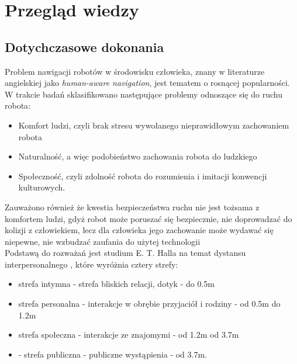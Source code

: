 \chapter{Przegląd wiedzy}

\section{Dotychczasowe dokonania}

Problem nawigacji robotów w środowisku człowieka, znany w literaturze angielskiej jako {\textit{human-aware navigation}}, jest tematem o rosnącej popularności. W trakcie badań sklasifikowano następujące problemy odnoszące się do ruchu robota\cite{survey}:

\begin{itemize}
\item Komfort ludzi, czyli brak stresu wywołanego nieprawidłowym zachowaniem robota
\item Naturalność, a więc podobieństwo zachowania robota do ludzkiego
\item Społeczność, czyli zdolność robota do rozumienia i imitacji konwencji kulturowych.
\end{itemize}

Zauważono również że kwestia bezpieczeństwa ruchu nie jest tożsama z komfortem ludzi, gdyż robot może poruszać się bezpiecznie, nie doprowadzać do kolizji z człowiekiem, lecz dla człowieka jego zachowanie może wydawać się niepewne, nie wzbudzać zaufania do użytej technologii \cite{survey} \\

\indent Podstawą do rozważań jest studium E. T. Halla na temat dystansu interpersonalnego \cite{dimension}, które wyróżnia cztery strefy:

\begin{itemize}
\item strefa intymna - strefa bliskich relacji, dotyk - do 0.5m
\item strefa personalna - interakcje w obrębie przyjaciół i rodziny - od 0.5m do 1.2m
\item strefa społeczna - interakcje ze znajomymi - od 1.2m od 3.7m
\item - strefa publiczna - publiczne wystąpienia - od 3.7m.
\end{itemize}

